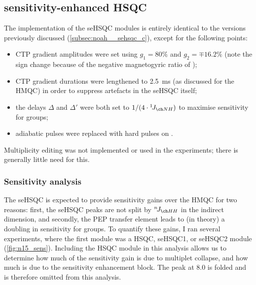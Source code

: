 \subsection{\texorpdfstring{\nitrogen{}}{15N} sensitivity-enhanced HSQC}
\label{subsec:noah__sehsqc_n}

The implementation of the \nitrogen{} seHSQC modules is entirely identical to the \carbon{} versions previously discussed (\cref{subsec:noah__sehsqc_c}), except for the following points:
\begin{itemize}
    \item CTP gradient amplitudes were set using $g_1 = 80\%$ and $g_2 = \mp 16.2\%$ (note the sign change because of the negative magnetogyric ratio of \nitrogen);
    \item CTP gradient durations were lengthened to \qty{2.5}{\ms} (as discussed for the \nitrogen{} HMQC) in order to suppress artefacts in the seHSQC itself;
    \item the delays $\Delta$ and $\Delta'$ were both set to $1/(4 \cdot \oneJ{NH})$ to maximise sensitivity for  groups;
    \item \carbon{} adiabatic pulses were replaced with hard pulses on \nitrogen{}.
\end{itemize}

Multiplicity editing was not implemented or used in the \nitrogen{} experiments; there is generally little need for this.

\subsubsection{Sensitivity analysis}

The seHSQC is expected to provide sensitivity gains over the HMQC for two reasons: first, the seHSQC peaks are not split by $\nJ{HH}$ in the indirect dimension, and secondly, the PEP transfer element leads to (in theory) a doubling in sensitivity for  groups.
To quantify these gains, I ran several  experiments, where the first module was a \nitrogen{} HSQC, seHSQC1, or seHSQC2 module (\cref{fig:n15_sens}).
Including the \nitrogen{} HSQC module in this analysis allows us to determine how much of the sensitivity gain is due to multiplet collapse, and how much is due to the sensitivity enhancement block.
The peak at \qty{8.0}{\ppm} is folded and is therefore omitted from this analysis.

